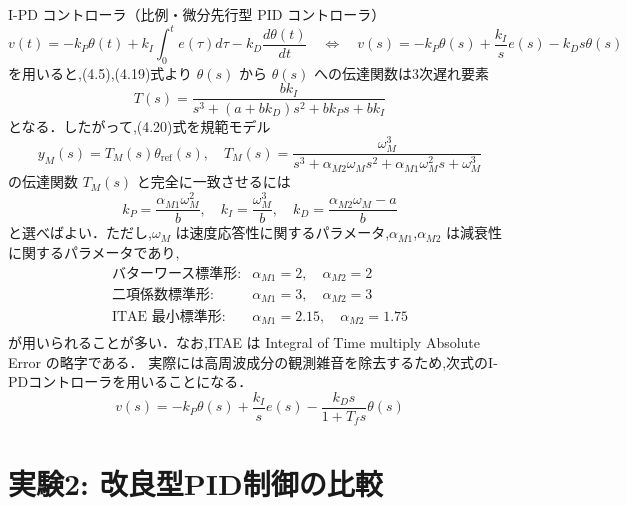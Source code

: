 I-PD コントローラ（比例・微分先行型 PID コントローラ）
\begin{equation}
  v(t) = -k_P \theta(t) + k_I \int_0^t e(\tau) d\tau - k_D \frac{d\theta(t)}{dt} \quad \Longleftrightarrow \quad v(s) = -k_P \theta(s) + \frac{k_I}{s} e(s) - k_D s \theta(s) \tag{4.19}
\end{equation}
を用いると,(4.5),(4.19)式より \(\theta(s)\) から \(\theta(s)\) への伝達関数は3次遅れ要素
\begin{equation}
  T(s) = \frac{b k_I}{s^3 + (a + b k_D)s^2 + b k_P s + b k_I} \tag{4.20}
\end{equation}
となる．したがって,(4.20)式を規範モデル
\begin{equation}
  y_M(s) = T_M(s) \theta_{\mathrm{ref}}(s), \quad T_M(s) = \frac{\omega_M^3}{s^3 + \alpha_{M2} \omega_M s^2 + \alpha_{M1} \omega_M^2 s + \omega_M^3} \tag{4.21}
\end{equation}
の伝達関数 \(T_M(s)\) と完全に一致させるには
\begin{equation}
  k_P = \frac{\alpha_{M1} \omega_M^2}{b}, \quad k_I = \frac{\omega_M^3}{b}, \quad k_D = \frac{\alpha_{M2} \omega_M - a}{b} \tag{4.22}
\end{equation}
と選べばよい．ただし,\(\omega_M\) は速度応答性に関するパラメータ,\(\alpha_{M1}\),\(\alpha_{M2}\) は減衰性に関するパラメータであり,
\begin{equation}
  \begin{array}{ll}
    \text{バターワース標準形}: & \alpha_{M1} = 2, \quad \alpha_{M2} = 2       \\
    \text{二項係数標準形}:     & \alpha_{M1} = 3, \quad \alpha_{M2} = 3       \\
    \text{ITAE 最小標準形}:    & \alpha_{M1} = 2.15, \quad \alpha_{M2} = 1.75 \\
  \end{array}
\end{equation}
が用いられることが多い．なお,ITAE は Integral of Time multiply Absolute Error の略字である．
実際には高周波成分の観測雑音を除去するため,次式のI-PDコントローラを用いることになる．
\begin{equation}
  v(s) = -k_P \theta(s) + \frac{k_I}{s}e(s) - \frac{k_D s}{1 + T_f s} \theta(s) \tag{4.23}
\end{equation}


\newpage

\section{実験2: 改良型PID制御の比較}

